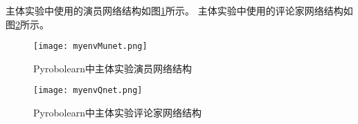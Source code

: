     主体实验中使用的演员网络结构如图\ref{myenvMunet}所示。
    主体实验中使用的评论家网络结构如图\ref{myenvQnet}所示。
    \begin{figure}[htpb]
        \centering
        \texttt{[image: myenvMunet.png]}
        \caption{Pyrobolearn中主体实验演员网络结构}
        \label{myenvMunet}
    \end{figure}

    \begin{figure}[htpb]
        \centering
        \texttt{[image: myenvQnet.png]}
        \caption{Pyrobolearn中主体实验评论家网络结构}
        \label{myenvQnet}
    \end{figure}
